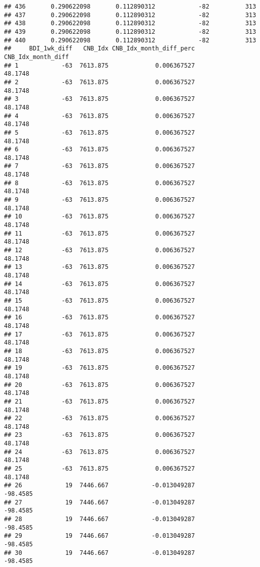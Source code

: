\documentclass[]{article}
\begin{document}
\begin{verbatim}
## 436       0.290622098       0.112890312            -82          313
## 437       0.290622098       0.112890312            -82          313
## 438       0.290622098       0.112890312            -82          313
## 439       0.290622098       0.112890312            -82          313
## 440       0.290622098       0.112890312            -82          313
##     BDI_1wk_diff   CNB_Idx CNB_Idx_month_diff_perc CNB_Idx_month_diff
## 1            -63  7613.875             0.006367527            48.1748
## 2            -63  7613.875             0.006367527            48.1748
## 3            -63  7613.875             0.006367527            48.1748
## 4            -63  7613.875             0.006367527            48.1748
## 5            -63  7613.875             0.006367527            48.1748
## 6            -63  7613.875             0.006367527            48.1748
## 7            -63  7613.875             0.006367527            48.1748
## 8            -63  7613.875             0.006367527            48.1748
## 9            -63  7613.875             0.006367527            48.1748
## 10           -63  7613.875             0.006367527            48.1748
## 11           -63  7613.875             0.006367527            48.1748
## 12           -63  7613.875             0.006367527            48.1748
## 13           -63  7613.875             0.006367527            48.1748
## 14           -63  7613.875             0.006367527            48.1748
## 15           -63  7613.875             0.006367527            48.1748
## 16           -63  7613.875             0.006367527            48.1748
## 17           -63  7613.875             0.006367527            48.1748
## 18           -63  7613.875             0.006367527            48.1748
## 19           -63  7613.875             0.006367527            48.1748
## 20           -63  7613.875             0.006367527            48.1748
## 21           -63  7613.875             0.006367527            48.1748
## 22           -63  7613.875             0.006367527            48.1748
## 23           -63  7613.875             0.006367527            48.1748
## 24           -63  7613.875             0.006367527            48.1748
## 25           -63  7613.875             0.006367527            48.1748
## 26            19  7446.667            -0.013049287           -98.4585
## 27            19  7446.667            -0.013049287           -98.4585
## 28            19  7446.667            -0.013049287           -98.4585
## 29            19  7446.667            -0.013049287           -98.4585
## 30            19  7446.667            -0.013049287           -98.4585

\end{verbatim}
\end{document}
